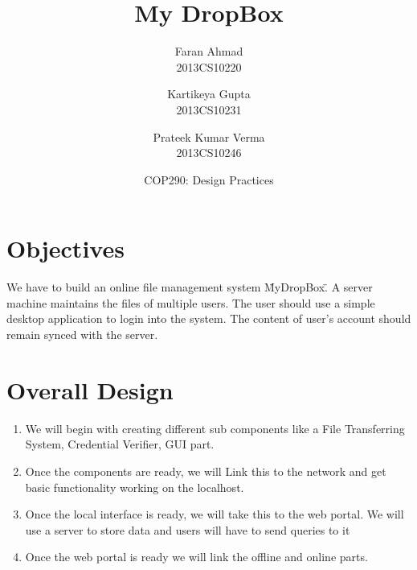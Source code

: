 \documentclass{article}
\title{\vspace*{\fill} My DropBox}
\author{
	Faran Ahmad\\
	2013CS10220
	\and
	Kartikeya Gupta\\ 
	2013CS10231
	\and
	Prateek Kumar Verma\\ 
	2013CS10246
}
\date{COP290: Design Practices \vspace*{\fill}}
\begin{document}
	\maketitle

	\newpage

	\section{Objectives}
	We have to build an online file management system \"MyDropBox\". A server machine maintains the files of multiple users. The user should use a simple desktop application to login into the system. The content of user's account should remain synced with the server. 

	\section{Overall Design}
		\begin{enumerate}
			\item We will begin with creating different sub components like a File Transferring System, Credential Verifier, GUI part.
			\item Once the components are ready, we will Link this to the network and get basic functionality working on the localhost.
			\item Once the local interface is ready, we will take this to the web portal. We will use a server to store data and users will have to send queries to it
			\item Once the web portal is ready we will link the offline and online parts.
		\end{enumerate}
\end{document}
